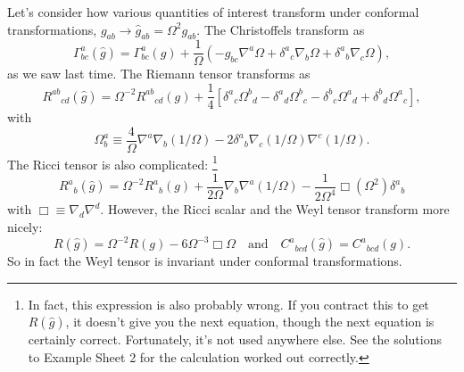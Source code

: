 Let's consider how various quantities of interest transform under conformal transformations,
$g_{ab}\to \hat g_{ab}=\Omega^2 g_{ab}.$
The Christoffels transform as
$$\Gamma^a_{bc}(\hat g)=\Gamma^a_{bc}(g)+\frac{1}{\Omega}(-g_{bc}\nabla^a \Omega +\delta^a{}_c \nabla_b \Omega +\delta^a{}_b \nabla_c \Omega),$$
as we saw last time. The Riemann tensor transforms as
$${R^{ab}}_{cd}(\hat g)=\Omega^{-2}{R^{ab}}_{cd}(g)+\frac{1}{4}[\delta^a{}_c \Omega^b{}_d - \delta^a{}_d \Omega^b{}_c -\delta^b{}_c \Omega^a{}_d +\delta^b{}_d \Omega^a{}_c],$$
with $$\Omega^a_b\equiv \frac{4}{\Omega}\nabla^a \nabla_b (1/\Omega)-2\delta^a{}_b \nabla_c(1/\Omega) \nabla^c(1/\Omega).$$
The Ricci tensor is also complicated:%
    \footnote{In fact, this expression is also probably wrong. If you contract this to get $R(\hat g)$, it doesn't give you the next equation, though the next equation is certainly correct. Fortunately, it's not used anywhere else. See the solutions to Example Sheet 2 for the calculation worked out correctly.}
$$R^a{}_b(\hat g)=\Omega^{-2}R^a{}_b(g) +\frac{1}{2\Omega}\nabla_b \nabla^a (1/\Omega)-\frac{1}{2\Omega^4}\Box (\Omega^2)\delta^a{}_b$$
with $\Box\equiv \nabla_d \nabla^d.$ However, the Ricci scalar and the Weyl tensor transform more nicely:
\begin{equation}\label{ricciconformal}
R(\hat g)=\Omega^{-2}R(g)-6\Omega^{-3}\Box \Omega \quad\text{and}\quad C^a{}_{bcd}(\hat g)=C^a{}_{bcd}(g).
\end{equation}
So in fact the Weyl tensor is invariant under conformal transformations.

